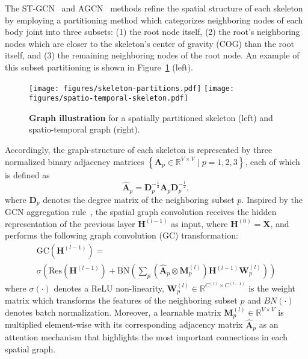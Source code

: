 \documentclass[journal]{IEEEtran}
\theoremstyle{definition}
\begin{document}
The ST-GCN~\cite{yan2018spatial} and AGCN~\cite{shi2019two} methods refine the spatial structure of each skeleton by employing a partitioning method which categorizes neighboring nodes of each body joint into three subsets: (1) the root node itself, 
(2) the root's neighboring nodes which are closer to the skeleton's center of gravity (COG) than the root itself, and (3) the remaining neighboring nodes of the root node. An example of this subset partitioning is shown in Figure~\ref{fig:ST-Graph-Partitioning} (left). 
\begin{figure}[tb]
    \centering
    \texttt{[image: figures/skeleton-partitions.pdf]}
    \texttt{[image: figures/spatio-temporal-skeleton.pdf]}
    \caption{\textbf{Graph illustration} for a spatially partitioned skeleton (left) and spatio-temporal graph (right).}
    \label{fig:ST-Graph-Partitioning}
\end{figure}
Accordingly, the graph-structure of each skeleton is represented by three normalized binary adjacency matrices $\left \{ \mathbf{A}_p \in \mathbb{R}^{V \times V} \mid  p = 1, 2, 3 \right \}$, each of which is defined as
\begin{equation}
    \hat{\mathbf{A}}_p = \mathbf{D}^{-\frac{1}{2}}_p\mathbf{A}_p\mathbf{D}^{-\frac{1}{2}}_p,  
\end{equation}
where $\mathbf{D}_p$ denotes the degree matrix of the neighboring subset $p$. 
Inspired by the GCN aggregation rule~\cite{kipf2016semi}, the spatial graph convolution receives the hidden representation of the previous layer $\mathbf{H}^{(l-1)}$ as input, where $\mathbf{H}^{(0)} = \mathbf{X}$, and performs the following graph convolution (GC) transformation:
\begin{multline}
    \text{GC}\left(\mathbf{H}^{(l-1)}\right) = \\
    \sigma\left(\text{Res}(\mathbf{H}^{(l-1)}) + \text{BN}\left(\sum_{p} (\mathbf{\hat{A}}_p\otimes \mathbf{M}_p^{(l)})\mathbf{H}^{(l-1)}\mathbf{W}_p^{(l)} \right)\right)
    \label{eq:graph_conv}
\end{multline}
where $\sigma(\cdot)$ denotes a ReLU non-linearity, $\mathbf{W}_p^{(l)} \in \mathbb{R}^{C^{(l)} \times C^{(l-1)}}$ is the weight matrix which transforms the features of the neighboring subset $p$ and $BN(\cdot)$ denotes batch normalization. Moreover, a learnable matrix $\mathbf{M}_p^{(l)} \in \mathbb{R}^{V \times V}$ is multiplied element-wise with its corresponding adjacency matrix $\mathbf{\hat{A}}_p$ as an attention mechanism that highlights the most important connections in each spatial graph. 
\end{document}
